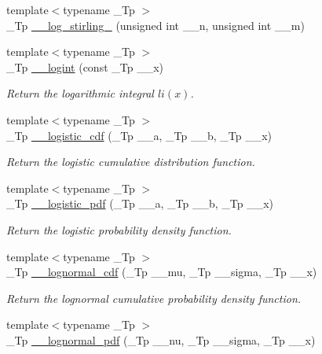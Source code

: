 \begin{DoxyCompactItemize}
\item 
{\footnotesize template$<$typename \+\_\+\+Tp $>$ }\\\+\_\+\+Tp \hyperlink{namespacestd_1_1____detail_a7ba1fde0547236676d579b6405f2fb25}{\+\_\+\+\_\+log\+\_\+stirling\+\_} (unsigned int \+\_\+\+\_\+n, unsigned int \+\_\+\+\_\+m)
\item 
{\footnotesize template$<$typename \+\_\+\+Tp $>$ }\\\+\_\+\+Tp \hyperlink{namespacestd_1_1____detail_a4d5f8cb2b4e6e192faba9418ec14149f}{\+\_\+\+\_\+logint} (const \+\_\+\+Tp \+\_\+\+\_\+x)
\begin{DoxyCompactList}\small\item\em Return the logarithmic integral $ li(x) $. \end{DoxyCompactList}\item 
{\footnotesize template$<$typename \+\_\+\+Tp $>$ }\\\+\_\+\+Tp \hyperlink{namespacestd_1_1____detail_abe893340d3de850ff3c9701deb914f96}{\+\_\+\+\_\+logistic\+\_\+cdf} (\+\_\+\+Tp \+\_\+\+\_\+a, \+\_\+\+Tp \+\_\+\+\_\+b, \+\_\+\+Tp \+\_\+\+\_\+x)
\begin{DoxyCompactList}\small\item\em Return the logistic cumulative distribution function. \end{DoxyCompactList}\item 
{\footnotesize template$<$typename \+\_\+\+Tp $>$ }\\\+\_\+\+Tp \hyperlink{namespacestd_1_1____detail_a4c845b9f17fc3e35dccc0954d82d62f9}{\+\_\+\+\_\+logistic\+\_\+pdf} (\+\_\+\+Tp \+\_\+\+\_\+a, \+\_\+\+Tp \+\_\+\+\_\+b, \+\_\+\+Tp \+\_\+\+\_\+x)
\begin{DoxyCompactList}\small\item\em Return the logistic probability density function. \end{DoxyCompactList}\item 
{\footnotesize template$<$typename \+\_\+\+Tp $>$ }\\\+\_\+\+Tp \hyperlink{namespacestd_1_1____detail_a871cf2e541cc4f8a79e4d219c628edc4}{\+\_\+\+\_\+lognormal\+\_\+cdf} (\+\_\+\+Tp \+\_\+\+\_\+mu, \+\_\+\+Tp \+\_\+\+\_\+sigma, \+\_\+\+Tp \+\_\+\+\_\+x)
\begin{DoxyCompactList}\small\item\em Return the lognormal cumulative probability density function. \end{DoxyCompactList}\item 
{\footnotesize template$<$typename \+\_\+\+Tp $>$ }\\\+\_\+\+Tp \hyperlink{namespacestd_1_1____detail_a46c5dea7a38f38965bce5a84d389a02b}{\+\_\+\+\_\+lognormal\+\_\+pdf} (\+\_\+\+Tp \+\_\+\+\_\+nu, \+\_\+\+Tp \+\_\+\+\_\+sigma, \+\_\+\+Tp \+\_\+\+\_\+x)

\end{DoxyCompactItemize}
